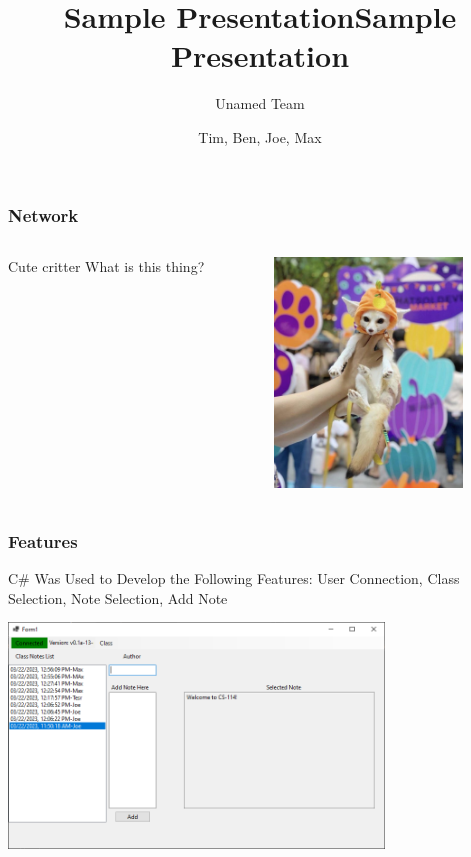 \documentclass{beamer}
\title{Sample Presentation}
\author{Unamed Team}
\institute{SNHU/CETA, EG-310}
\title{Sample Presentation}
\author{Tim, Ben, Joe, Max}
\institute{SNHU/CETA, EG-310}
\begin{document}
\frame{\titlepage} %

\begin{frame}
    \frametitle{Network}

    \begin{columns}
        \begin{column}{0.48\textwidth}
            \begin{block}{Cute critter}
                What is this thing?
            \end{block}
        \end{column}
        \begin{column}{0.48\textwidth}
            \includegraphics[width=5cm]{what_is_this_thing}
        \end{column}
    \end{columns}

\end{frame}


\begin{frame}
    \frametitle{Features}



    \begin{block}{\centering C\# Was Used to Develop the Following Features:}
        \centering User Connection, Class Selection, Note Selection, Add Note
    \end{block}

    \centering \includegraphics[height=6cm]{Sample_of_Features.PNG}

\end{frame}
\end{document}
